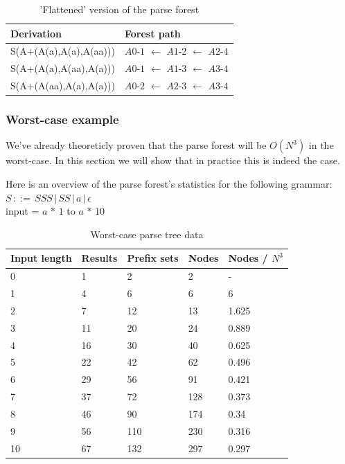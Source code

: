 \documentclass[a4paper,10pt]{article}
\begin{document}
\begin{table}[H]
\centering
\begin{tabular}{ p{15em} p{15em} }
Derivation & Forest path\\
\hline
S(A+(A(a),A(a),A(aa))) & $A0$-$1$ $\leftarrow$ $A1$-$2$ $\leftarrow$ $A2$-$4$\\
S(A+(A(a),A(aa),A(a))) & $A0$-$1$ $\leftarrow$ $A1$-$3$ $\leftarrow$ $A3$-$4$\\
S(A+(A(aa),A(a),A(a))) & $A0$-$2$ $\leftarrow$ $A2$-$3$ $\leftarrow$ $A3$-$4$
\end{tabular}
\caption{'Flattened' version of the parse forest}
\end{table}

\subsubsection{Worst-case example}
We've already theoreticly proven that the parse forest will be $O(N^3)$ in the worst-case. In this section we will show that in practice this is indeed the case.

Here is an overview of the parse forest's statistics for the following grammar:\\
$S\,::=\,SSS\,|\,SS\,|\,a\,|\,\epsilon$\\
input = $a\,*\,1$ to $a\,*\,10$

\begin{table}[H]
\centering
\begin{tabular}{ | p{6em} | p{4em} | p{5em} | p{4em} | p{5em} | }
  \hline
  Input length & Results & Prefix sets & Nodes & Nodes / $N^3$ \\
  \hline
  0 & 1 & 2 & 2 & - \\
  1 & 4 & 6 & 6 & 6 \\
  2 & 7 & 12 & 13 & 1.625 \\
  3 & 11 & 20 & 24 & 0.889 \\
  4 & 16 & 30 & 40 & 0.625 \\
  5 & 22 & 42 & 62 & 0.496 \\
  6 & 29 & 56 & 91 & 0.421 \\
  7 & 37 & 72 & 128 & 0.373 \\
  8 & 46 & 90 & 174 & 0.34 \\
  9 & 56 & 110 & 230 & 0.316 \\
  10 & 67 & 132 & 297 & 0.297 \\
  \hline
\end{tabular}
\caption{Worst-case parse tree data}
\end{table}
\end{document}
